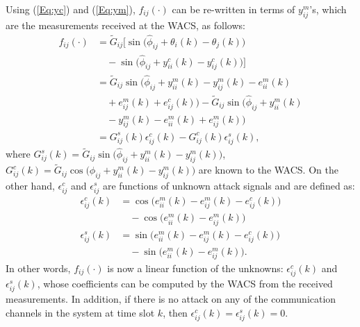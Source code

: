 Using (\ref{Eq:yc}) and (\ref{Eq:ym}), $f_{ij} (\cdot)$ can be re-written in terms of $y^m_{ij}$'s, which are the measurements received at the WACS, as follows:
\begin{equation} \label{Eq:case2_f_ij}
\begin{aligned}
	f_{ij} (\cdot ) &= \tilde G_{ij} \big[ \sin \big(\widehat{\phi}_{ij} + \theta_i(k) - \theta_j(k)\big) \\
		& \quad- \sin \big(\widehat{\phi}_{ij} + y^c_{ii}(k) - y^c_{ij}(k)\big) \big]\\
		& = \tilde G_{ij}  \sin \big(\widehat{\phi}_{ij} + y^m_{ii}(k) - y^m_{ij}(k) - e^m_{ii}(k) \\
		& \quad + e^m_{ij}(k) + e^c_{ij}(k)\big) - \tilde G_{ij} \sin \big(\widehat{\phi}_{ij} + y^m_{ii}(k) \\
		& \quad - y^m_{ij}(k) - e^m_{ii}(k) + e^m_{ij}(k)\big) \\
		& = G_{ij}^s (k) \epsilon_{ij}^c  (k)  -  G_{ij}^c  (k)  \epsilon_{ij}^s (k),
\end{aligned}\nonumber
\end{equation}
where $ G_{ij}^s(k) = \tilde G_{ij} \sin \big(\widehat{\phi}_{ij} + y^m_{ii}(k) - y^m_{ij}(k)\big)$, $ G_{ij}^c (k) = \tilde G_{ij} \cos \big(\widehat{\phi}_{ij} + y^m_{ii}(k) -y^m_{ij}(k)\big)$ are known to the WACS. On the other hand, $\epsilon_{ij}^c$ and $\epsilon_{ij}^s$ are functions of unknown attack signals and are defined as:
\begin{equation}\label{eq:epsilon_cs}
\begin{aligned}
\epsilon_{ij}^c(k) &= \cos \big(e^m_{ii}(k) - e^m_{ij}(k) - e^c_{ij}(k)\big) \\
& \quad - \cos \big(e^m_{ii}(k) - e^m_{ij}(k)\big) \\
\epsilon_{ij}^s (k) &= \sin \big(e^m_{ii}(k) - e^m_{ij}(k) - e^c_{ij}(k)\big) \\
& \quad - \sin \big(e^m_{ii}(k) - e^m_{ij}(k)\big).
\end{aligned}
\end{equation}
In other words, $f_{ij}(\cdot)$ is now a linear function of the unknowns: $\epsilon_{ij}^c(k)$ and $\epsilon_{ij}^s(k)$, whose coefficients can be computed by the WACS from the received measurements. In addition, if there is no attack on any of the communication channels in the system at time slot $k$, then $\epsilon_{ij}^c (k) = \epsilon_{ij}^s (k) = 0$.

